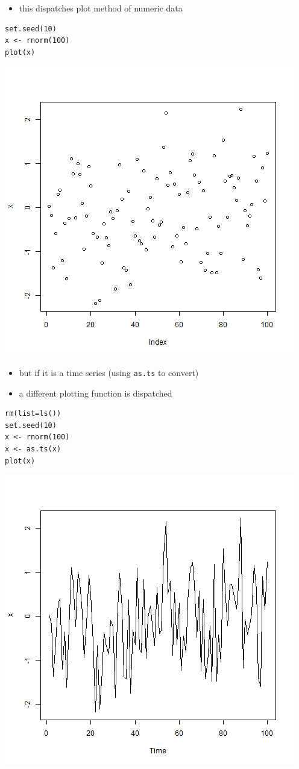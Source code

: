 \documentclass[11pt]{article}
\begin{document}
\begin{itemize}
\item this dispatches plot method of numeric data
\end{itemize}

\begin{verbatim}
set.seed(10)
x <- rnorm(100)
plot(x)
\end{verbatim}

\includegraphics[width=.9\linewidth]{wk4_1.png}

\begin{itemize}
\item but if it is a time series (using \texttt{as.ts} to convert)
\item a different plotting function is dispatched
\end{itemize}

\begin{verbatim}
rm(list=ls())
set.seed(10)
x <- rnorm(100)
x <- as.ts(x)
plot(x)
\end{verbatim}

\includegraphics[width=.9\linewidth]{tsFig.png}
\end{document}

